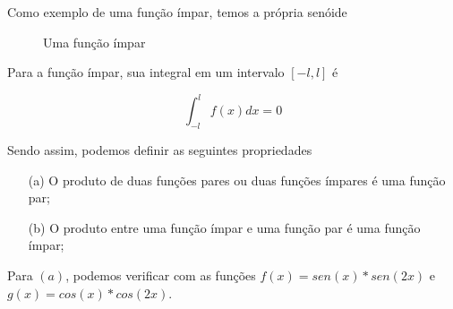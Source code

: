 Como exemplo de uma função ímpar, temos a própria senóide
\begin{figure}[H]
\begin{center}
    \caption{Uma função ímpar}
    \label{fig:funcImpar}
\end{center}
\end{figure}

Para a função ímpar, sua integral em um intervalo $[-l,l]$ é

\begin{equation}
\label{eq:intImpar}
    \int_{-l}^{l} f(x)dx = 0
\end{equation}

Sendo assim, podemos definir as seguintes propriedades \\
\begin{definicao}
\label{def:opPar}
    \begin{enumerate}
        \item[(a)] O produto de duas funções pares ou duas funções ímpares 
        é uma função par;
        \item[(b)] O produto entre uma função ímpar e uma função par é uma 
        função ímpar;
    \end{enumerate}
\end{definicao}

Para $(a)$, podemos verificar com as funções $f(x) = sen(x) *  sen(2x)$ e 
$g(x) = cos(x) * cos(2x)$.


